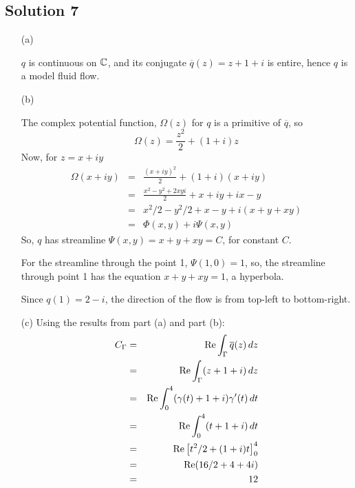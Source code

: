 \subsection*{Solution 7}

\begin{itemize}
\item[(a)]

$q$ is continuous on $\mathbb{C}$, and its conjugate
$\overline{q}(z) = z+1+i$
is entire, hence $q$ is a model fluid flow.

\item[(b)]

The complex potential function, $\Omega(z)$ for $q$ is a primitive of
$\overline{q}$, so
\[
\Omega(z) = \frac{z^2}{2}+(1+i)z
\]
Now, for $z=x+iy$
\begin{eqnarray*}
\Omega(x+iy)
	&=& \frac{ (x+iy)^2 }{ 2 } + (1+i)(x+iy) \\
	&=& \frac{ x^2-y^2 +2xyi }{2} + x + iy + ix - y \\
	&=& x^2/2 - y^2/2 + x - y + i(x + y + xy) \\
	&=& \Phi(x,y) + i\Psi(x,y)
\end{eqnarray*}
So, $q$ has streamline $\Psi(x,y)=x+y+xy=C$, for constant $C$.

For the streamline through the point 1, $\Psi(1,0) = 1$, so, the
streamline through point 1 has the equation $x+y+xy=1$, a hyperbola.



Since $q(1)=2-i$, the direction of the flow is from top-left to
bottom-right.

\item[(c)]
Using the results from part (a) and part (b):
\begin{eqnarray*}
C_\Gamma
	&=& {\rm Re} \int_\Gamma \overline{q}(z)\,dz \\
	&=& {\rm Re} \int_\Gamma (z+1+i)\,dz \\
	&=& {\rm Re} \int_0^4 (\gamma(t)+1+i)\gamma'(t)\,dt \\
	&=& {\rm Re} \int_0^4 (t+1+i)\,dt \\
	&=& {\rm Re} \left[ t^2/2+(1+i)t \right]_0^4 \\
	&=& {\rm Re} ( 16/2 +4+4i ) \\
	&=& 12
\end{eqnarray*}

\end{itemize}

